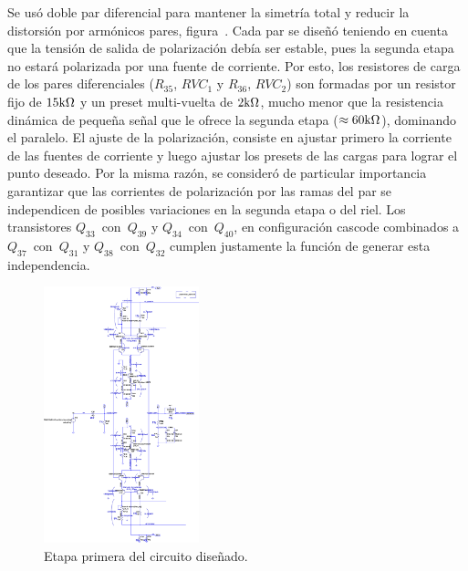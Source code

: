 Se usó doble par diferencial para mantener la simetría total y reducir la distorsión por armónicos pares, figura~. Cada par se diseñó teniendo en cuenta que la tensión de salida de polarización debía ser estable, pues la segunda etapa no estará polarizada por una fuente de corriente. Por esto, los resistores de carga de los pares diferenciales ($R_{35}$, $RVC_{1}$ y $R_{36}$, $RVC_{2}$) son formadas por un resistor fijo de $15 \si[per-mode=symbol]{\kilo\ohm}$ y un preset multi-vuelta de $2 \si[per-mode=symbol]{\kilo\ohm}$, mucho menor que la resistencia dinámica de pequeña señal que le ofrece la segunda etapa ($\approx 60 \si[per-mode=symbol]{\kilo\ohm}$), dominando el paralelo. El ajuste de la polarización, consiste en ajustar primero la corriente de las fuentes de corriente y luego ajustar los presets de las cargas para lograr el punto deseado.
Por la misma razón, se consideró de particular importancia garantizar que las corrientes de polarización por las ramas del par se independicen de posibles variaciones en la segunda etapa o del riel. Los transistores $Q_{33}$~con~$Q_{39}$ y $Q_{34}$~con~$Q_{40}$, en configuración cascode combinados a $Q_{37}$~con~$Q_{31}$ y $Q_{38}$~con~$Q_{32}$ cumplen justamente la función de generar esta independencia.


\begin{figure}
  \begin{center}
   \includegraphics[width=0.4\textwidth]{img/etapa-1.png}
   \caption{Etapa primera del circuito diseñado.}
   \label{fig:etapa-1}
  \end{center}   
\end{figure}


